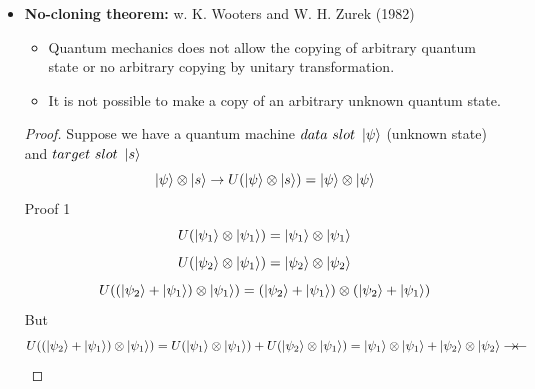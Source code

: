 \documentclass[]{book}
\theoremstyle{nonumberplain}
\begin{document}
\begin{itemize}

\item \textbf{No-cloning theorem: }w. K. Wooters and W. H. Zurek (1982)
\begin{itemize}
	\item Quantum mechanics does not allow the copying of arbitrary quantum state or no arbitrary copying by unitary transformation. \\
	\item It is not possible to make a copy of an arbitrary unknown quantum state.
\end{itemize}
\begin{proof}
Suppose we have a quantum machine $data\ slot\ \ket{\psi}$ (unknown state) and $target\ slot\ \ket{s}$
\[
\ket{\psi}\otimes\ket{s}\rightarrow U(\ket{\psi}\otimes\ket{s})=\ket{\psi}\otimes\ket{\psi}
\] 
Proof 1
\[
	U(\ket{\psi_{1}}\otimes\ket{\psi_{1}})=\ket{\psi_{1}}\otimes\ket{\psi_{1}}
\] 
\[
	U(\ket{\psi_{2}}\otimes\ket{\psi_{1}})=\ket{\psi_{2}}\otimes\ket{\psi_{2}}
\] 
\[
	U((\ket{\psi_{2}}+\ket{\psi_{1}})\otimes\ket{\psi_{1}})=(\ket{\psi_{2}}+\ket{\psi_{1}})\otimes (\ket{\psi_{2}}+\ket{\psi_{1}})
\] 
But
\[
	U((\ket{\psi_{2}}+\ket{\psi_{1}})\otimes\ket{\psi_{1}})=U(\ket{\psi_{1}}\otimes\ket{\psi_{1}}) + U(\ket{\psi_{2}}\otimes\ket{\psi_{1}}) = \ket{\psi_{1}}\otimes\ket{\psi_{1}}+\ket{\psi_{2}}\otimes\ket{\psi_{2}}\rightarrow\!\leftarrow
\]
\end{proof}
\end{itemize}
\end{document}
